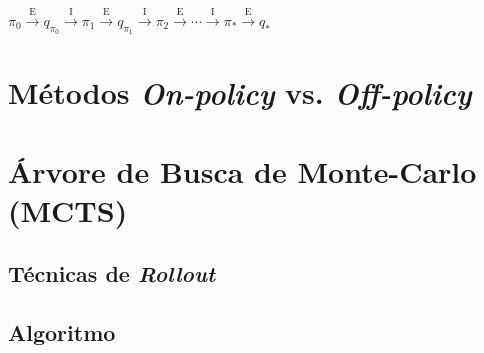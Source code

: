 \documentclass{article}
\begin{document}
        \begin{center}
            \begin{math}
                \pi_0 \xrightarrow{\ \textrm{E} \ } 
                q_{\pi_0} \xrightarrow{\ \textrm{I} \ } 
                \pi_1 \xrightarrow{\ \textrm{E} \ } 
                q_{\pi_1} \xrightarrow{\ \textrm{I} \ } 
                \pi_2 \xrightarrow{\ \textrm{E} \ } 
                \cdots \xrightarrow{\ \textrm{I} \ }
                \pi_* \xrightarrow{\ \textrm{E} \ } q_{*}
            \end{math}
        \end{center}
    
    \section{Métodos \textit{On-policy} vs. \textit{Off-policy}}
    
    \section{Árvore de Busca de Monte-Carlo (MCTS)}
    
        \subsection{Técnicas de \textit{Rollout}}
        
        \subsection{Algoritmo}
\end{document}
